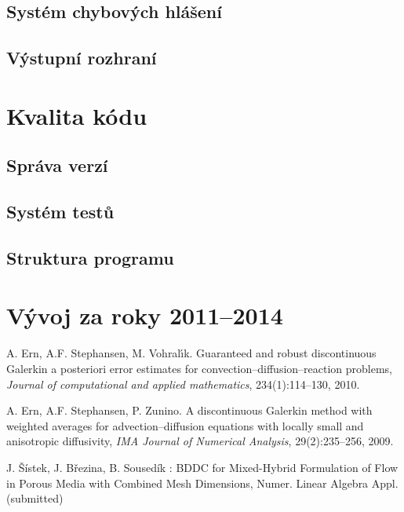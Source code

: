 \documentclass[11pt]{report}
\begin{document}
\subsection{Systém chybových hlášení}
\subsection{Výstupní rozhraní}

\section{Kvalita kódu}
\subsection{Správa verzí}
\subsection{Systém testů}
\subsection{Struktura programu}



\section{Vývoj za roky 2011--2014}

\begin{thebibliography}{99}

A. Ern, A.F. Stephansen, M. Vohral{\'\i}k.
Guaranteed and robust discontinuous Galerkin a posteriori error estimates for convection--diffusion--reaction problems,
\emph{Journal of computational and applied mathematics}, 234(1):114--130, 2010.


A. Ern, A.F. Stephansen, P. Zunino.
A discontinuous {G}alerkin method with weighted averages for advection--diffusion equations with locally small and anisotropic diffusivity,
\emph{IMA Journal of Numerical Analysis}, 29(2):235--256, 2009.


J. Šístek, J. Březina, B. Sousedík : BDDC for Mixed-Hybrid 
Formulation of Flow in Porous Media with Combined Mesh Dimensions, Numer. Linear 
Algebra Appl. (submitted)
\end{thebibliography}
\end{document}

